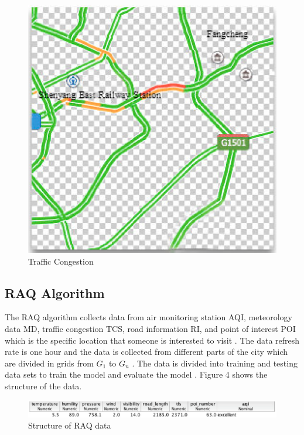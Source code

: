 \documentclass[sigconf]{acmart}
\begin{document}
\begin{figure}
\includegraphics[width=1.0\textwidth]{images/fig3.png}
\caption{Traffic Congestion\cite{raq2016}}
\end{figure}

\subsection{RAQ Algorithm}
The RAQ algorithm collects data from air monitoring station AQI, meteorology data MD, traffic congestion TCS, road information RI, and point of interest POI which is the specific location that someone is interested to visit \cite{raq2016}. The data refresh rate is one hour and the data is collected from different parts of the city which are divided in grids from $G_1$ to $G_n$ \cite{raq2016}. The data is divided into training and testing data sets to train the model and evaluate the model \cite{raq2016}. Figure 4 shows the structure of the data.

\begin{figure}
\includegraphics[width=1.0\textwidth]{images/fig4.png}
\caption{Structure of RAQ data\cite{raq2016}}
\end{figure}
\end{document}
